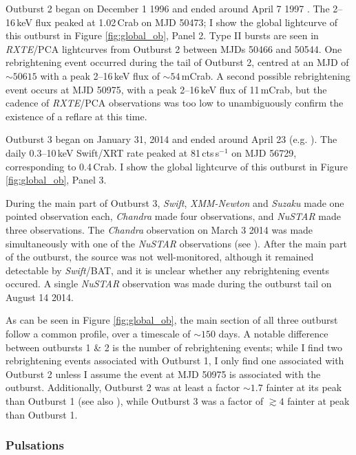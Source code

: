 \par Outburst 2 began on December 1 1996 and ended around April 7 1997 \citep{Woods_OB2}.  The 2--16\,keV flux peaked at 1.02\,Crab on MJD 50473; I show the global lightcurve of this outburst in Figure \ref{fig:global_ob}, Panel 2.  Type II bursts are seen in \textit{RXTE}/PCA lightcurves from Outburst 2 between MJDs 50466 and 50544.  One rebrightening event occurred during the tail of Outburst 2, centred at an MJD of $\sim50615$ with a peak 2--16\,keV flux of $\sim54$\,mCrab.  A second possible rebrightening event occurs at MJD 50975, with a peak 2--16\,keV flux of 11\,mCrab, but the cadence of \textit{RXTE}/PCA observations was too low to unambiguously confirm the existence of a reflare at this time.

\par Outburst 3 began on January 31, 2014 \citep{Negoro_OB3,Kennea_BPOutburst} and ended around April 23 (e.g. \citealp{Dai_OB3}).  The daily 0.3--10\,keV Swift/XRT rate peaked at 81\,cts\,s$^{-1}$ on MJD 56729, corresponding to 0.4\,Crab.  I show the global lightcurve of this outburst in Figure \ref{fig:global_ob}, Panel 3.
\par During the main part of Outburst 3, \textit{Swift}, \textit{XMM-Newton} and \textit{Suzaku} made one pointed observation each, \textit{Chandra} made four observations, and \textit{NuSTAR} made three observations.  The \textit{Chandra} observation on March 3 2014 was made simultaneously with one of the \textit{NuSTAR} observations (see \citealp{Younes_Expo}).  After the main part of the outburst, the source was not well-monitored, although it remained detectable by \textit{Swift}/BAT, and it is unclear whether any rebrightening events occured.  A single \textit{NuSTAR} observation was made during the outburst tail on August 14 2014.

\par As can be seen in Figure \ref{fig:global_ob}, the main section of all three outburst follow a common profile, over a timescale of $\sim150$ days.  A notable difference between outbursts 1 \& 2 is the number of rebrightening events; while I find two rebrightening events associated with Outburst 1, I only find one associated with Outburst 2 unless I assume the event at MJD 50975 is associated with the outburst.  Additionally, Outburst 2 was at least a factor $\sim1.7$ fainter at its peak than Outburst 1 (see also \citealp{Woods_OB2}), while Outburst 3 was a factor of $\gtrsim4$ fainter at peak than Outburst 1.

\subsubsection{Pulsations}

